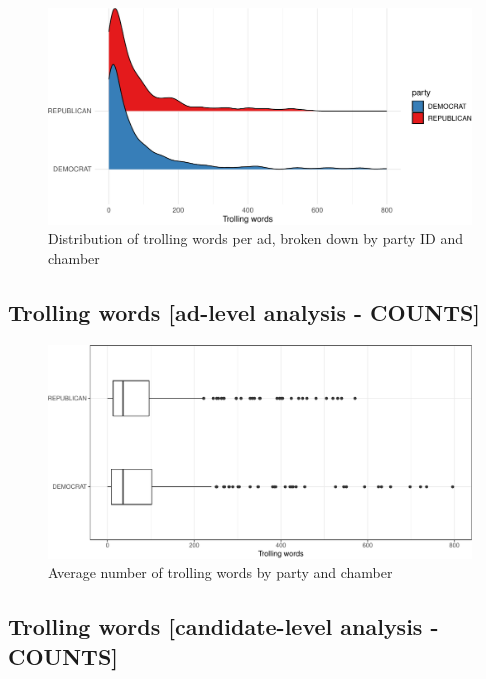 \documentclass[
  12pt,
]{article}
\begin{document}
\begin{figure}
\centering
\includegraphics{figsFB/unnamed-chunk-18-1.pdf}
\caption{\label{fig:unnamed-chunk-18}Distribution of trolling words per ad, broken down by party ID and chamber}
\end{figure}

\pagebreak
\clearpage

\hypertarget{trolling-words-ad-level-analysis---counts}{%
\subsection{Trolling words {[}ad-level analysis - COUNTS{]}}\label{trolling-words-ad-level-analysis---counts}}

\begin{figure}
\centering
\includegraphics{figsFB/unnamed-chunk-19-1.pdf}
\caption{\label{fig:unnamed-chunk-19}Average number of trolling words by party and chamber}
\end{figure}

\pagebreak
\clearpage

\hypertarget{trolling-words-candidate-level-analysis---counts}{%
\subsection{Trolling words {[}candidate-level analysis - COUNTS{]}}\label{trolling-words-candidate-level-analysis---counts}}
\end{document}
